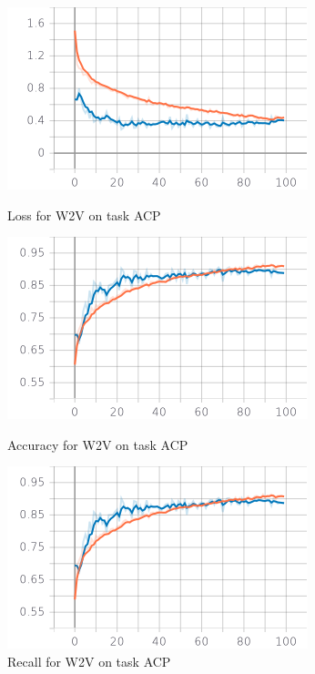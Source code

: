 \documentclass{article}
\begin{document}
            \begin{figure}[!htb]
                \begin{minipage}{0.48\textwidth}
                    \centering
                    \includegraphics[width=.7\linewidth]{w2v_acp_epoch_loss.png}
                    \caption{Loss for W2V on task ACP}\label{Fig:Data1}
                \end{minipage}\hfill
                \begin{minipage}{0.48\textwidth}
                    \centering
                    \includegraphics[width=.7\linewidth]{w2v_acp_epoch_accuracy.png}
                    \caption{Accuracy for W2V on task ACP}\label{Fig:Data2}
                \end{minipage}
                \begin{minipage}{0.48\textwidth}
                    \centering
                    \includegraphics[width=.7\linewidth]{w2v_acp_epoch_recall.png}
                    \caption{Recall for W2V on task ACP}\label{Fig:Data3}
                \end{minipage}
            \end{figure}
\end{document}
